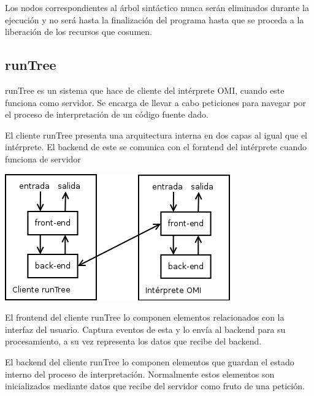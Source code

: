 Los nodos correspondientes al árbol sintáctico nunca serán eliminados durante la ejecución y no será hasta la finalización del programa hasta que se proceda a la liberación de los recursos 
que cosumen.





\subsection{runTree}
runTree es un sistema que hace de cliente del intérprete OMI, cuando este funciona como servidor. Se encarga de llevar a cabo peticiones para navegar por el proceso de interpretación de un código
fuente dado. 

El cliente runTree presenta una arquitectura interna en dos capas al igual que el intérprete. El backend de este se comunica con el forntend del intérprete cuando funciona de servidor

\begin{center}
\includegraphics[scale=0.7]{generic_cliente_servidor.png} \\
\end{center}

El frontend del cliente runTree lo componen elementos relacionados con la interfaz del usuario. Captura eventos de esta y lo envía al backend para su procesamiento, a su vez representa los datos que recibe del backend. 

El backend del cliente runTree lo componen elementos que guardan el estado interno del proceso de interpretación. Normalmente estos elementos son inicializados mediante datos que recibe del servidor como fruto de 
una petición.






